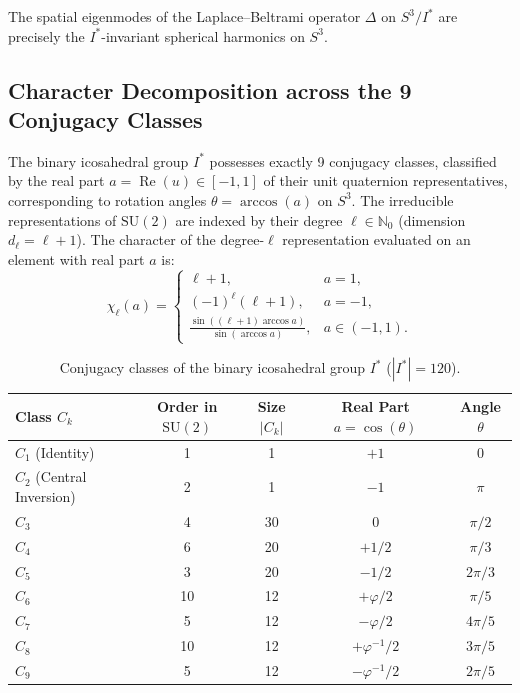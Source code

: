 \documentclass[11pt,a4paper]{article}
\theoremstyle{definition}
\newcommand{\N}{\mathbb{N}}
\newcommand{\SU}{\mathrm{SU}}
\newcommand{\PDS}{S^3 / I^*}
\newcommand{\Istar}{I^*}
\begin{document}
The spatial eigenmodes of the Laplace--Beltrami operator $\Delta$ on $\PDS$ are precisely the $\Istar$-invariant spherical harmonics on $S^3$. 

\subsection{Character Decomposition across the 9 Conjugacy Classes}
The binary icosahedral group $\Istar$ possesses exactly 9 conjugacy classes, classified by the real part $a = \operatorname{Re}(u) \in [-1, 1]$ of their unit quaternion representatives, corresponding to rotation angles $\theta = \arccos(a)$ on $S^3$. The irreducible representations of $\SU(2)$ are indexed by their degree $\ell \in \N_0$ (dimension $d_\ell = \ell + 1$). The character of the degree-$\ell$ representation evaluated on an element with real part $a$ is:
\begin{equation}
    \chi_\ell(a) = \begin{cases}
        \ell + 1, & a = 1, \\
        (-1)^\ell (\ell + 1), & a = -1, \\
        \frac{\sin((\ell + 1)\arccos a)}{\sin(\arccos a)}, & a \in (-1, 1).
    \end{cases}
\end{equation}

\begin{table}[t]
\centering
\caption{Conjugacy classes of the binary icosahedral group $\Istar$ ($|\Istar| = 120$).}
\label{tab:conjugacy_classes}
\small
\begin{tabular}{lcccc}
\toprule
Class $C_k$ & Order in $\SU(2)$ & Size $|C_k|$ & Real Part $a = \cos(\theta)$ & Angle $\theta$ \\
\midrule
$C_1$ (Identity) & 1 & 1 & $+1$ & $0$ \\
$C_2$ (Central Inversion) & 2 & 1 & $-1$ & $\pi$ \\
$C_3$ & 4 & 30 & $0$ & $\pi/2$ \\
$C_4$ & 6 & 20 & $+1/2$ & $\pi/3$ \\
$C_5$ & 3 & 20 & $-1/2$ & $2\pi/3$ \\
$C_6$ & 10 & 12 & $+\varphi/2$ & $\pi/5$ \\
$C_7$ & 5 & 12 & $-\varphi/2$ & $4\pi/5$ \\
$C_8$ & 10 & 12 & $+\varphi^{-1}/2$ & $3\pi/5$ \\
$C_9$ & 5 & 12 & $-\varphi^{-1}/2$ & $2\pi/5$ \\
\bottomrule
\end{tabular}
\end{table}
\end{document}
